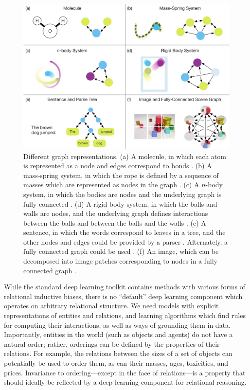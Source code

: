 \begin{figure}[t!]
\centering
\includegraphics[width=\textwidth]{figures/graphs}
\caption{Different graph representations. (a) A molecule, in which each atom is represented as a node and edges correspond to bonds \citep[e.g.][]{duvenaud2015convolutional}. (b) A mass-spring system, in which the rope is defined by a sequence of masses which are represented as nodes in the graph \citep[e.g.][]{battaglia2016interaction,chang2016compositional}. (c) A $n$-body system, in which the bodies are nodes and the underlying graph is fully connected \citep[e.g.][]{battaglia2016interaction,chang2016compositional}. (d) A rigid body system, in which the balls and walls are nodes, and the underlying graph defines interactions between the balls and between the balls and the walls \citep[e.g.][]{battaglia2016interaction,chang2016compositional}. (e) A sentence, in which the words correspond to leaves in a tree, and the other nodes and edges could be provided by a parser \citep[e.g.][]{socher2013recursive}. 
Alternately, a fully connected graph could be used \citep[e.g.][]{vaswani2017attention}.
(f) An image, which can be decomposed into image patches corresponding to nodes in a fully connected graph \citep[e.g.][]{santoro2017simple,wang2017non}.}
\label{fig:graphs}
\end{figure}

While the standard deep learning toolkit contains methods with various forms of relational inductive biases, there is no ``default'' deep learning component which operates on arbitrary relational structure.
We need models with explicit representations of entities and relations, and learning algorithms which find rules for computing their interactions, as well as ways of grounding them in data.
Importantly, entities in the world (such as objects and agents) do not have a natural order; rather, orderings can be defined by the properties of their relations.
For example, the relations between the sizes of a set of objects can potentially be used to order them, as can their masses, ages, toxicities, and prices.
Invariance to ordering---except in the face of relations---is a property that should ideally be reflected by a deep learning component for relational reasoning.

